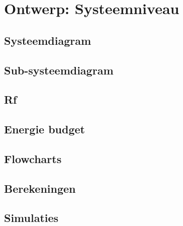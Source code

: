\section{Ontwerp: Systeemniveau}
\subsection{Systeemdiagram}
\subsection{Sub-systeemdiagram }%

\subsection{Rf}

\subsection{Energie budget}

\subsection{Flowcharts}
\subsection{Berekeningen}
\subsection{Simulaties}




%
